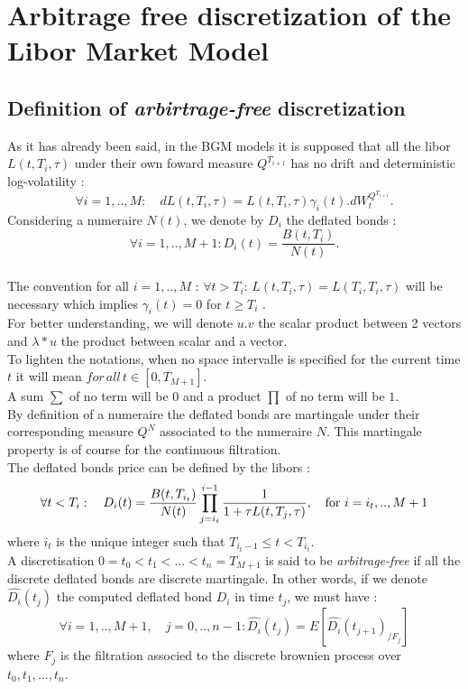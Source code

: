 
\vspace{10mm}
\section{Arbitrage free discretization of the Libor Market Model}
\subsection{Definition of {\it arbirtrage-free} discretization}
As it has already been said, in the BGM models it is supposed that all the libor 
$L(t,T_i,\tau)$ under their own foward measure $Q^{T_{i+1}}$  has no drift and 
deterministic log-volatility :
$$\forall i=1,..,M : \quad dL(t,T_i,\tau)=L(t,T_i,\tau)\gamma_i(t).dW^{Q^{T_{i+1}}}_t.$$
Considering a numeraire $N(t)$, we denote by $D_i$ the deflated bonds :
$$\forall i=1,..,M+1 : D_i(t)=\frac{B(t,T_i)}{N(t)}.$$
 \\
The
convention for all $i=1,..,M$ : $\forall
t>T_i:\,L(t,T_i,\tau)=L(T_i,T_i,\tau)$ will be necessary which implies
$\gamma_i(t)=0$ for $t \geq T_i$ .  \\
For better understanding, we will denote $u.v$ the scalar product
between 2 vectors and $\lambda * u$ the product between scalar and a
vector.\\
To lighten the notations, when no space intervalle is specified for the
current time $t$ it will mean $for \,all \,t \in [0,T_{M+1}]$.\\
A sum $\sum$ of no term will be $0$ and a product $\prod$ of no term will be $1$.\\

\noindent By definition of a numeraire the deflated bonds are martingale under their 
corresponding measure $Q^N$ associated to the numeraire $N$.
This martingale property is of course for the continuous filtration.\\
The deflated bonds price can be defined by the libors :
$$\forall t<T_i:\quad D_i(t)=\frac{B(t,T_{i_t})}{N(t)}\prod_{j=i_t}^{i-1}\frac{1}{1+\tau
    L(t,T_j,\tau)},\quad \hbox{for } i=i_t,..,M+1$$
where $i_t$ is the unique integer such that $T_{i_t-1} \le t
<T_{i_t}$.\\

 A discretisation $0=t_0<t_1<...<t_n=T_{M+1}$ is said to be
{\it arbitrage-free} if all the discrete deflated bonds are discrete
martingale. In other words, if we denote $\hat{D_i}(t_j)$ the computed
deflated bond $D_i$ in time $t_j$, we must have :
\begin{equation}
\label{def}
\forall i=1,..,M+1, \quad j=0,..,n-1
:\hat{D_i}(t_j)=E\left[\hat{D_i}(t_{j+1}) _{/{F}_j}\right]
\end{equation}
where ${F}_j$ is the filtration  associed to the discrete brownien
process over ${t_0, t_1, ...,t_n}$.\\

